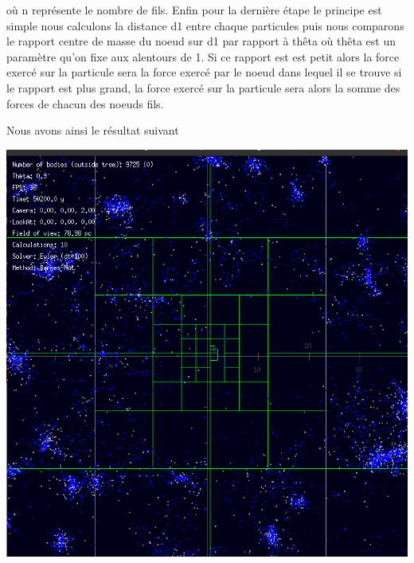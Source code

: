 où n représente le nombre de fils.
\newline
Enfin  pour la dernière étape le principe est simple nous calculons la distance d1 entre chaque particules puis nous comparons le rapport centre de masse du noeud sur d1 par rapport à thêta où thêta est un paramètre qu'on fixe aux alentours de 1. Si ce rapport est est petit alors la force exercé sur la particule sera la force exercé par le noeud dans lequel il se trouve si le rapport est plus grand, la force exercé sur la particule sera alors la somme des forces de chacun des noeuds fils.


Nous avons ainsi le résultat suivant
\begin{center}
\includegraphics[scale=0.6]{arbre_bh.png}
\label{figbh}
\end{center}
